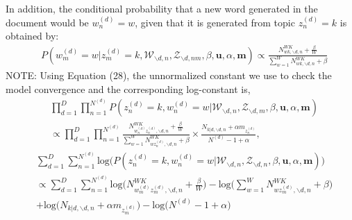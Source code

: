 \documentclass[a4paper]{article}
\begin{document}
  In addition, the conditional probability that a new word generated in the document would be $w_n^{(d)}=w$, given that it is generated from topic $z_n^{(d)}=k$ is obtained by:
  \begin{equation}
  \begin{aligned}
  & P(w^{(d)}_m=w|z^{(d)}_m=k, \mathcal{W}_{\backslash d, n}, \mathcal{Z}_{\backslash d, nm}, \beta, \boldsymbol{u}, \alpha, \boldsymbol{m}) \propto 
  \frac{N_{wk, \backslash d, n}^{WK}+\frac{\beta}{W}}{\sum_{w=1}^WN_{wk, \backslash d, n}^{WK}+\beta}
  \end{aligned} 
  \end{equation}
  NOTE: Using Equation (28), the unnormalized constant we use to check the model convergence and the corresponding log-constant is,
  \begin{equation}
  \begin{aligned}
  & \prod_{d=1}^{D}\prod_{n=1}^{N^{(d)}}  P(z^{(d)}_n=k, w^{(d)}_n=w|\mathcal{W}_{\backslash d, n}, \mathcal{Z}_{\backslash d,m}, \beta, \boldsymbol{u}, \alpha, \boldsymbol{m}) \\ & \propto \prod_{d=1}^{D}\prod_{n=1}^{N^{(d)}} 
  \frac{N_{w^{(d)}_nz^{(d)}_n, \backslash d, n}^{WK}+\frac{\beta}{W}}{\sum_{w=1}^WN_{wz^{(d)}_n,  \backslash d, n}^{WK}+\beta}\times\frac{N_{k|d, \backslash d, n}+\alpha m_{z^{(d)}_n}}{N^{(d)}-1+\alpha},
  \end{aligned}
  \end{equation}
  \begin{equation}
  \begin{aligned}
  & \sum_{d=1}^{D}\sum_{n=1}^{N^{(d)}} \mbox{log}\Big( P(z^{(d)}_n=k, w^{(d)}_n=w|\mathcal{W}_{\backslash d, n}, \mathcal{Z}_{\backslash d, n}, \beta, \boldsymbol{u}, \alpha, \boldsymbol{m})\Big) \\ & \propto \sum_{d=1}^{D}\sum_{n=1}^{N^{(d)}} 
  \mbox{log}\Big(N_{w^{(d)}_mz^{(d)}_m, \backslash d, n}^{WK}+\frac{\beta}{W}\Big)-\mbox{log}\Big(\sum_{w=1}^WN_{wz^{(d)}_m,  \backslash d, n}^{WK}+\beta\Big)\\&+\mbox{log}\Big(N_{k|d, \backslash d, n}+\alpha m_{z^{(d)}_m}\Big)-\mbox{log}\Big(N^{(d)}-1+\alpha\Big)
  \end{aligned}
  \end{equation}
 

\end{document}

